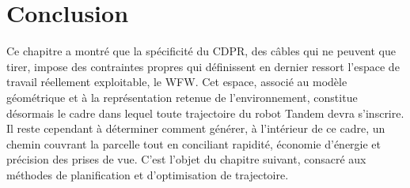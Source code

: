 \begin{table}[H]
\centering
\caption{Synthèse comparative des espaces de travail}
\label{tab:espaces}
\end{table}

\section*{Conclusion}

Ce chapitre a montré que la spécificité du CDPR, des câbles qui ne peuvent que tirer, impose des contraintes propres qui définissent en dernier ressort l'espace de travail réellement exploitable, le WFW. Cet espace, associé au modèle géométrique et à la représentation retenue de l'environnement, constitue désormais le cadre dans lequel toute trajectoire du robot Tandem devra s'inscrire. Il reste cependant à déterminer comment générer, à l'intérieur de ce cadre, un chemin couvrant la parcelle tout en conciliant rapidité, économie d'énergie et précision des prises de vue. C'est l'objet du chapitre suivant, consacré aux méthodes de planification et d'optimisation de trajectoire.

